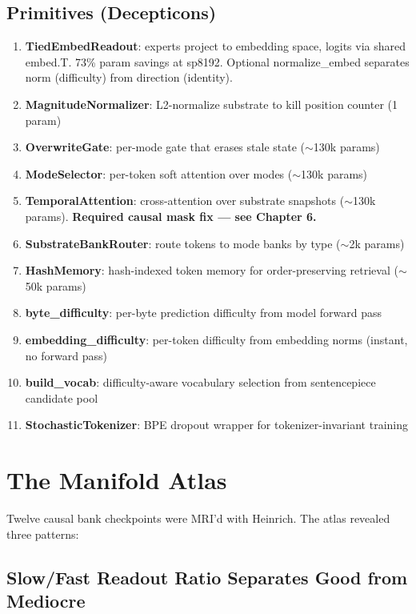 \documentclass[11pt,a4paper]{report}
\begin{document}
\section{Primitives (Decepticons)}

\begin{enumerate}
\item \textbf{TiedEmbedReadout}: experts project to embedding space, logits via shared embed.T. 73\% param savings at sp8192. Optional normalize\_embed separates norm (difficulty) from direction (identity).
\item \textbf{MagnitudeNormalizer}: L2-normalize substrate to kill position counter (1 param)
\item \textbf{OverwriteGate}: per-mode gate that erases stale state ($\sim$130k params)
\item \textbf{ModeSelector}: per-token soft attention over modes ($\sim$130k params)
\item \textbf{TemporalAttention}: cross-attention over substrate snapshots ($\sim$130k params). \textbf{Required causal mask fix --- see Chapter 6.}
\item \textbf{SubstrateBankRouter}: route tokens to mode banks by type ($\sim$2k params)
\item \textbf{HashMemory}: hash-indexed token memory for order-preserving retrieval ($\sim$50k params)
\item \textbf{byte\_difficulty}: per-byte prediction difficulty from model forward pass
\item \textbf{embedding\_difficulty}: per-token difficulty from embedding norms (instant, no forward pass)
\item \textbf{build\_vocab}: difficulty-aware vocabulary selection from sentencepiece candidate pool
\item \textbf{StochasticTokenizer}: BPE dropout wrapper for tokenizer-invariant training
\end{enumerate}


\chapter{The Manifold Atlas}

Twelve causal bank checkpoints were MRI'd with Heinrich. The atlas revealed three patterns:

\section{Slow/Fast Readout Ratio Separates Good from Mediocre}
\end{document}
